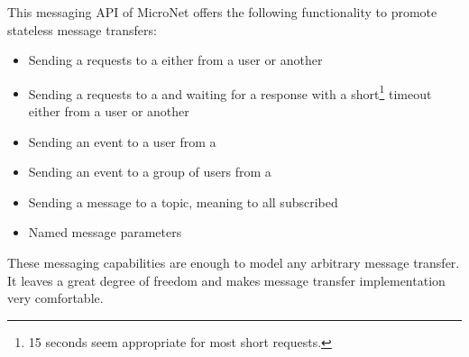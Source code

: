 This messaging API of MicroNet offers the following functionality to promote
stateless message transfers:

\begin{itemize}
  \item Sending a requests to a \ms{} either from a user or another \ms{}
  \item Sending a requests to a \ms{} and waiting for a response with a
  short\footnote{15 seconds seem appropriate for most short requests.} timeout
  either from a user or another \ms{}
  \item Sending an event to a user from a \ms{}
  \item Sending an event to a group of users from a \ms{}
  \item Sending a message to a topic, meaning to all subscribed \mss{}
  \item Named message parameters
\end{itemize}

These messaging capabilities are enough to model any arbitrary message transfer.
It leaves a great degree of freedom and makes message transfer implementation
very comfortable. 